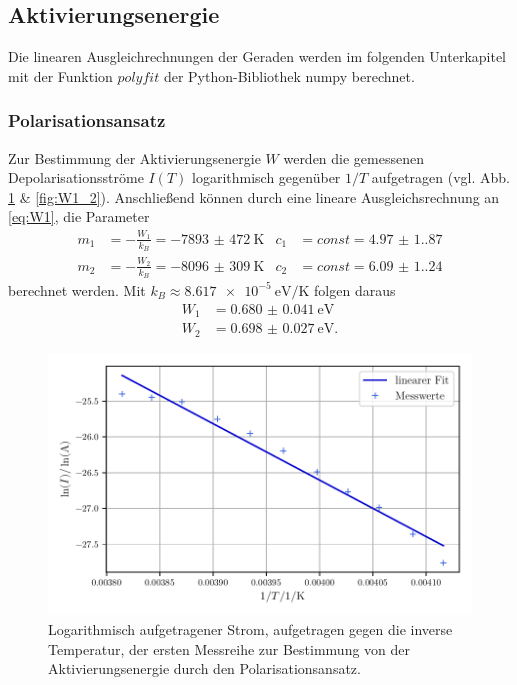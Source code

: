 \subsection{Aktivierungsenergie}
Die linearen Ausgleichrechnungen der Geraden werden im folgenden Unterkapitel mit der Funktion $polyfit$ der Python-Bibliothek numpy\cite{numpy} berechnet.
\subsubsection{Polarisationsansatz}
Zur Bestimmung der Aktivierungsenergie $W$ werden die gemessenen Depolarisationsströme $I(T)$ 
logarithmisch gegenüber $1/T$ aufgetragen (vgl. Abb. \ref{fig:W1_1} \& \ref{fig:W1_2}). Anschließend können durch eine lineare Ausgleichsrechnung an \autoref{eq:W1}, die Parameter
\begin{align}
    m_1 &= - \frac{W_1}{k_B} = \qty{-7893(472)}{\kelvin} & c_1 &= const = \num{4.97(1.87)} \\
    m_2 &= - \frac{W_2}{k_B} = \qty{-8096(309)}{\kelvin} & c_2 &= const = \num{6.09(1.24)}
\end{align}
berechnet werden. Mit $k_B \approx \qty{8,617e-5}{\electronvolt\per\kelvin}$ folgen daraus
\begin{align}
    W_1 &= \qty{0.680(41)}{\electronvolt} \\
    W_2 &= \qty{0.698(27)}{\electronvolt}.
\end{align}
\begin{figure}
    \centering
    \includegraphics[width=0.7\linewidth]{scripts/build/plot1_1.pdf}
    \caption{Logarithmisch aufgetragener Strom, aufgetragen gegen die inverse Temperatur, der ersten Messreihe zur Bestimmung von der Aktivierungsenergie durch den Polarisationsansatz.}
    \label{fig:W1_1}
\end{figure}

